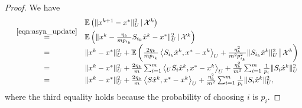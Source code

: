 {\begin{proof}
We have
\begin{equation}\label{eqn:equality_inconsistent}
\begin{array}{rcl}
&&\mathbb{E}\left(\|x^{k+1} - x^*\|_U^2\,|\,\cX^k\right)\\
&\overset{\eqref{eqn:asyn_update}}=&\mathbb{E}\left(\|x^{k}  -
\textstyle\frac{\eta_k}{mp_{i_k}}S_{i_k} \hat{x}^{k}- x^*
\|_U^2\,|\,\cX^k\right)\cr &=& \|x^k -
x^*\|_U^2+\mathbb{E}\left(\textstyle\frac{2\eta_k}{mp_{i_k}} \left\langle
S_{i_k} \hat{x}^{k}, x^* - x^k \right\rangle_U +
\textstyle\frac{\eta_k^2}{m^2p_{i_k}^2}
\|S_{i_k}\hat{x}^{k}\|_U^2\,\big|\,\cX^k\right)\cr &=&\|x^k -
x^*\|_U^2+\textstyle\frac{2\eta_k}{m} \sum_{i=1}^m\left\langle_U S_i
\hat{x}^{k}, x^* - x^k \right\rangle_U +
\frac{\eta_k^2}{m^2}\sum_{i=1}^m\frac{1}{p_i}\|S_i\hat{x}^{k}\|_U^2\cr &=&\|x^k
- x^*\|_U^2+\textstyle\frac{2\eta_k}{m} \left\langle S \hat{x}^{k}, x^* - x^k
\right\rangle_U +\frac{\eta_k^2}{m^2} \sum_{i=1}^m\frac{1}{p_i}
\|S_i\hat{x}^{k}\|_U^2,
\end{array}
\end{equation}
where the third equality holds because the probability of choosing $i$ is $p_i$.


\end{proof}}
